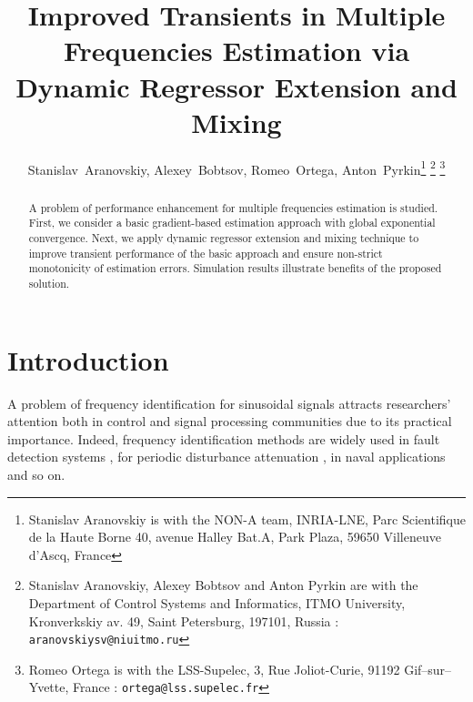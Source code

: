 \documentclass[journal, onecolumn]{IEEEtran}
\begin{document}
\title{Improved Transients in Multiple Frequencies Estimation via Dynamic Regressor Extension and Mixing} 
\author{Stanislav~Aranovskiy,
        Alexey~Bobtsov,
				Romeo~Ortega,
        Anton~Pyrkin\thanks{Stanislav Aranovskiy is with the NON-A team, INRIA-LNE, Parc Scientifique de la Haute Borne 40, avenue Halley Bat.A, Park Plaza, 59650 Villeneuve d'Ascq, France}		
\thanks{Stanislav Aranovskiy, Alexey Bobtsov and Anton Pyrkin are with the Department of Control Systems and Informatics, ITMO University, Kronverkskiy av. 49, Saint Petersburg, 197101, Russia :  {\tt\small aranovskiysv@niuitmo.ru}}
\thanks{Romeo Ortega is with the LSS-Supelec, 3, Rue Joliot-Curie, 91192 Gif--sur--Yvette, France : {\tt\small ortega@lss.supelec.fr}}
}

\maketitle 

\begin{abstract}                A problem of performance enhancement for multiple frequencies estimation is studied. First, we consider a basic gradient-based estimation approach with global exponential convergence. Next, we apply dynamic regressor extension and mixing technique to improve transient performance of the basic approach and ensure non-strict monotonicity of estimation errors. Simulation results illustrate benefits of the proposed solution.
\end{abstract}



\section{Introduction}
A problem of frequency identification for sinusoidal signals attracts researchers' attention both in control and signal processing communities due to its practical importance. Indeed, frequency identification methods are widely used in fault detection systems \cite{goupil2010oscillatory}, for periodic disturbance attenuation \cite{landau2011adaptive, bobtsov2011compensation}, in naval applications \cite{belleter2013globally} and so on.
\end{document}
